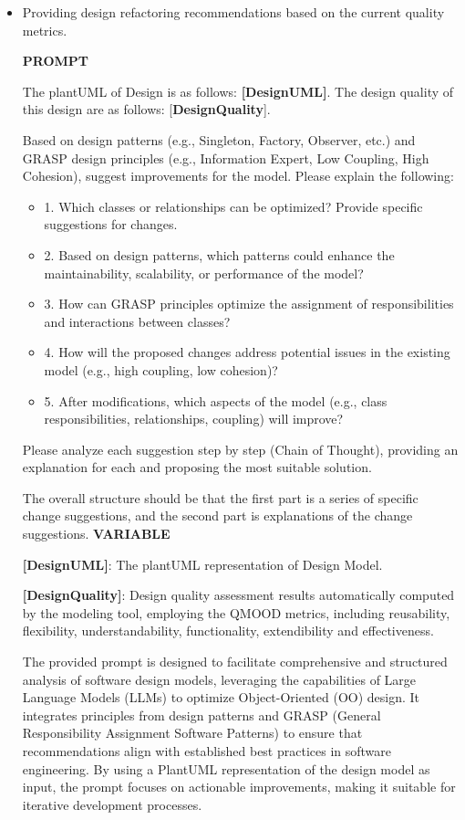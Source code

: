 \documentclass[pdflatex,sn-mathphys-num]{sn-jnl}%
\theoremstyle{thmstyleone}%
\theoremstyle{thmstyletwo}%
\theoremstyle{thmstylethree}%
\begin{document}
\begin{itemize}
    \item Providing design refactoring recommendations based on the current quality metrics.
    
\begin{tcolorbox}[title = {Model refactoring Suggestion}]
\textbf{PROMPT}

The plantUML of Design is as follows: \textbf{[DesignUML]}. 
The design quality of this design are as follows: [\textbf{DesignQuality}].

Based on design patterns (e.g., Singleton, Factory, Observer, etc.) and GRASP design principles (e.g., Information Expert, Low Coupling, High Cohesion), suggest improvements for the model. Please explain the following: 
\begin{itemize}
    \item 1. Which classes or relationships can be optimized? Provide specific suggestions for changes.
    \item 2. Based on design patterns, which patterns could enhance the maintainability, scalability, or performance of the model?
    \item 3. How can GRASP principles optimize the assignment of responsibilities and interactions between classes?
    \item 4. How will the proposed changes address potential issues in the existing model (e.g., high coupling, low cohesion)?
    \item 5. After modifications, which aspects of the model (e.g., class responsibilities, relationships, coupling) will improve?
\end{itemize}

Please analyze each suggestion step by step (Chain of Thought), providing an explanation for each and proposing the most suitable solution.

The overall structure should be that the first part is a series of specific change suggestions, and the second part is explanations of the change suggestions.
\tcblower
\textbf{VARIABLE}

\textbf{[DesignUML]}: The plantUML representation of Design Model.

\textbf{[DesignQuality]}: Design quality assessment results automatically computed by the modeling tool, employing the QMOOD metrics, including reusability, flexibility, understandability, functionality, extendibility and effectiveness.
\end{tcolorbox}
The provided prompt is designed to facilitate comprehensive and structured analysis of software design models, leveraging the capabilities of Large Language Models (LLMs) to optimize Object-Oriented (OO) design. It integrates principles from design patterns and GRASP (General Responsibility Assignment Software Patterns) to ensure that recommendations align with established best practices in software engineering. By using a PlantUML representation of the design model as input, the prompt focuses on actionable improvements, making it suitable for iterative development processes.


\end{itemize}
\end{document}
